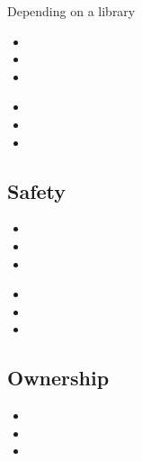 \documentclass[xcolor={svgnames},hyperref]{beamer}
\begin{document}
    \begin{frame}
        Depending on a library
        \begin{itemize}
            \item
            \item
            \item
        \end{itemize}
    \end{frame}

    \begin{frame}
        \begin{itemize}
            \item
            \item
            \item
        \end{itemize}
    \end{frame}

\subsection{Safety}

    \begin{frame}
        \begin{itemize}
            \item
            \item
            \item
        \end{itemize}
    \end{frame}


    \begin{frame}
        \begin{itemize}
            \item
            \item
            \item
        \end{itemize}
    \end{frame}



\subsection{Ownership}

    \begin{frame}
        \begin{itemize}
            \item
            \item
            \item
        \end{itemize}
    \end{frame}
\end{document}
